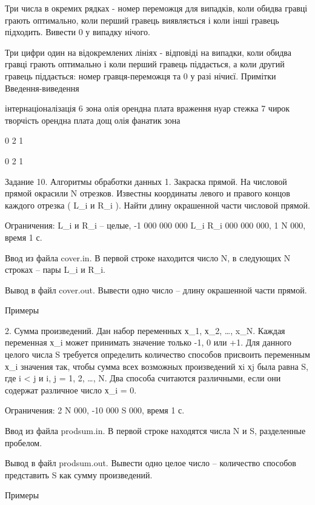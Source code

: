 \documentclass[]{article}
\begin{document}
Три числа в окремих рядках - номер переможця для випадків, коли обидва гравці грають оптимально, коли перший гравець виявляється і коли інші гравець підходить. Вивести 0 у випадку нічого.

Три цифри один на відокремлених лініях - відповіді на випадки, коли обидва гравці грають оптимально і коли перший гравець піддається, а коли другий гравець піддається: номер гравця-переможця та 0 у разі нічиєї.
Примітки
Введення-виведення

інтернаціоналізація
6
зона
олія
орендна плата
враження
нуар
стежка
7
чирок
творчість
орендна плата
дощ
олія
фанатик
зона



0
2
1




0
2
1



Задание 10. Алгоритмы обработки данных
1. Закраска прямой. На числовой прямой окрасили N отрезков. Известны координаты левого и правого концов каждого отрезка ( L_i и R_i ). Найти длину окрашенной части числовой прямой.

Ограничения: L_i и R_i – целые, -1 000 000 000 \leq L_i \leq R_i  000 000 000, 1 \leq N  000, время 1 с.

Ввод из файла cover.in. В первой строке находится число N, в следующих N строках – пары L_i и R_i.

Вывод в файл cover.out. Вывести одно число – длину окрашенной части прямой.

Примеры



2. Сумма произведений. Дан набор переменных х_1, х_2, \ldots , x_N. Каждая переменная х_i может принимать значение только -1, 0 или +1. Для данного целого числа S требуется определить количество способов присвоить переменным х_i значения так, чтобы сумма всех возможных произведений хi хj была равна S, где i < j и i, j = 1, 2, \ldots, N. Два способа считаются различными, если они содержат различное число х_i = 0.

Ограничения: 2 \leq N  000, -10 000 \leq S  000, время 1 с.

Ввод из файла prodsum.in. В первой строке находятся числа N и S, разделенные пробелом.

Вывод в файл prodsum.out. Вывести одно целое число – количество способов представить S как сумму произведений.

Примеры
\end{document}
